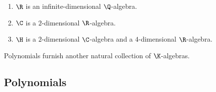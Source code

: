 \begin{exm}{}{}
	\begin{enumerate}
		\item $\R$ is an infinite-dimensional $\Q$-algebra.
		\item $\C$ is a $2$-dimensional $\R$-algebra.
		\item $\H$ is a $2$-dimensional $\C$-algebra and a $4$-dimensional $\R$-algebra. 
	\end{enumerate}
\end{exm}

Polynomials furnish another natural collection of $\K$-algebras.

\subsection{Polynomials}

